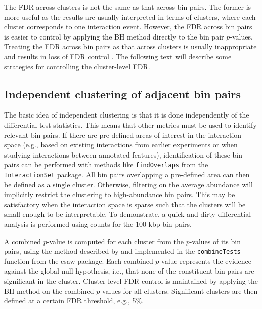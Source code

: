 \documentclass[12pt]{report}
\renewenvironment{Schunk}{\vspace{0pt}}{\vspace{0pt}}
\newcommand{\csaw}{csaw}
\newcommand{\code}[1]{{\small\texttt{#1}}}
\begin{document}
The FDR across clusters is not the same as that across bin pairs.
The former is more useful as the results are usually interpreted in terms of clusters, where each cluster corresponds to one interaction event.
However, the FDR across bin pairs is easier to control by applying the BH method directly to the bin pair $p$-values.
Treating the FDR across bin pairs as that across clusters is usually inappropriate and results in loss of FDR control \citep{lun2014denovo}.
The following text will describe some strategies for controlling the cluster-level FDR.

\subsection{Independent clustering of adjacent bin pairs}
\label{sec:independentcluster}

The basic idea of independent clustering is that it is done independently of the differential test statistics.
This means that other metrics must be used to identify relevant bin pairs.
If there are pre-defined areas of interest in the interaction space
    (e.g., based on existing interactions from earlier experiments or when studying interactions between annotated features),
    identification of these bin pairs can be performed with methods like \code{findOverlaps} from the \code{InteractionSet} package.
All bin pairs overlapping a pre-defined area can then be defined as a single cluster.
Otherwise, filtering on the average abundance will implicitly restrict the clustering to high-abundance bin pairs.
This may be satisfactory when the interaction space is sparse such that the clusters will be small enough to be interpretable.
To demonstrate, a quick-and-dirty differential analysis is performed using counts for the 100 kbp bin pairs.

\begin{Schunk}
\end{Schunk}

A combined $p$-value is computed for each cluster from the $p$-values of its bin pairs, using the method described by \cite{simes1986} and implemented in the \code{combineTests} function from the \csaw{} package.
Each combined $p$-value represents the evidence against the global null hypothesis, i.e., that none of the constituent bin pairs are significant in the cluster.
Cluster-level FDR control is maintained by applying the BH method on the combined $p$-values for all clusters.
Significant clusters are then defined at a certain FDR threshold, e.g., 5\%.
\end{document}
